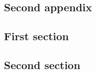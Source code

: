 \begin{appendices}
  \chapter{Second appendix}
  \section{First section}
  \section{Second section}
\end{appendices}